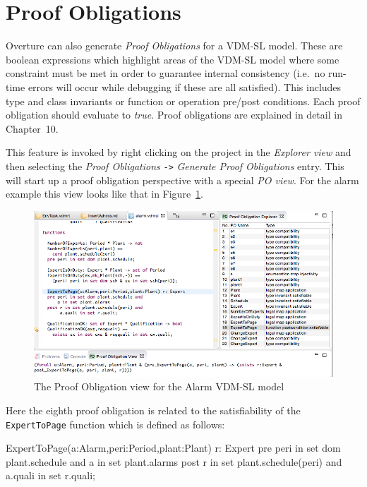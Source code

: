 \section{Proof Obligations}\label{sec:POtool}

Overture can also generate \emph{Proof Obligations} for a VDM-SL model. These are boolean expressions which highlight areas of the VDM-SL model where some constraint must be met in order to guarantee internal consistency (i.e.\ no run-time errors will occur while debugging if these are all satisfied). This includes type and class invariants or function or operation pre/post conditions. Each proof
obligation should evaluate to \emph{true}. Proof obligations are explained in detail in Chapter~10.

This feature is invoked by right clicking on the project in the \emph{Explorer view} and then selecting the \emph{Proof Obligations} \texttt{->} \emph{Generate Proof Obligations} entry. This will start up a proof obligation perspective with a special \emph{PO view}. For the alarm example this view looks like that in Figure~\ref{fig:POview}.
%
\begin{figure}[htbp]
\begin{center}
\includegraphics[width=5.5in]{figures/poview}
\caption{The Proof Obligation view for the Alarm VDM-SL model\label{fig:POview}}
\end{center}
\end{figure}
%
Here the eighth proof obligation is related to the satisfiability of the \texttt{ExpertToPage} function which is defined as follows: 

\begin{vdmsl}
ExpertToPage(a:Alarm,peri:Period,plant:Plant) r: Expert
  pre peri in set dom plant.schedule and
      a in set plant.alarms
  post r in set plant.schedule(peri) and
       a.quali in set r.quali;
\end{vdmsl}

